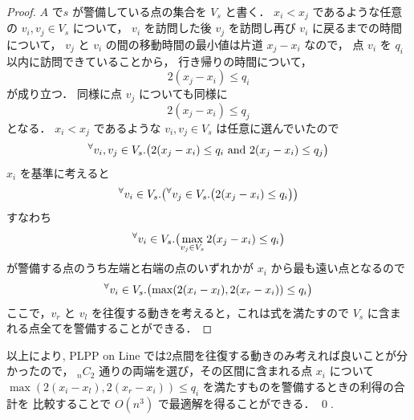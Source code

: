 \begin{proof}
	$A$ で\server $s$ が警備している点の集合を $V_s$ と書く．
	$x_i < x_j$ であるような任意の $v_i, v_j \in V_s$ について，
	$v_i$ を訪問した後 $v_j$ を訪問し再び $v_i$ に戻るまでの時間について，
	$v_j$ と $v_i$ の間の移動時間の最小値は片道 $x_j - x_i$ なので，
	点 $v_i$ を $q_i$ 以内に訪問できていることから，
	行き帰りの時間について，
	\begin{equation}
		2(x_j - x_i) \leq q_i
	\end{equation}
	が成り立つ．
	同様に点 $v_j$ についても同様に
	\begin{equation}
		2(x_j - x_i) \leq q_j
	\end{equation}
	となる．
	$x_i < x_j$ であるような $v_i, v_j \in V_s $ は任意に選んでいたので
	\begin{equation}
		{}^\forall v_i, v_j \in V_s . \bigl(
			2(x_j - x_i) \leq q_i \text{ and } 2(x_j - x_i) \leq q_j
		\bigr)
	\end{equation}
	$x_i$ を基準に考えると
	\begin{equation}
		{}^\forall v_i \in V_s . \bigl(
			{}^\forall v_j \in V_s . 
			\bigl(
				2(x_j - x_i) \leq q_i
			\bigr)
		\bigr)
	\end{equation}
	すなわち
	\begin{equation}
		{}^\forall v_i \in V_s . \bigl(
			\max_{v_j \in V_s} 2(x_j - x_i) \leq q_i
		\bigr)
	\end{equation}
	\server が警備する点のうち左端と右端の点のいずれかが $x_i$ から最も遠い点となるので
	\begin{equation}
		{}^\forall v_i \in V_s . \bigl(
			\max( 2(x_i - x_l), 2(x_r - x_i) ) \leq q_i
		\bigr)
		\label{eq:PLPPonLine_2}
	\end{equation}
	ここで，$v_r$ と $v_l$ を往復する動きを考えると，これは式を満たすので
	$V_s$ に含まれる点全てを警備することができる．
\end{proof}

以上により, PLPP on Line では2点間を往復する動きのみ考えれば良いことが分かったので，
${}_n C_2$ 通りの両端を選び，その区間に含まれる点 $x_i$ について
$\max( 2(x_i - x_l), 2(x_r - x_i) ) \leq q_i$ を満たすものを警備するときの利得の合計を
比較することで $O(n^3)$ で最適解を得ることができる．
\qed {}.

